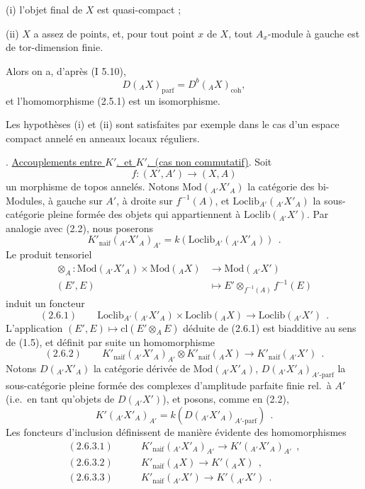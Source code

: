 \smallskip

(i) l'objet final de $X$ est quasi-compact ;

(ii) $X$ a assez de points, et, pour tout point $x$ de $X$, tout $A_x$-module \`{a} gauche est de tor-dimension finie.

Alors on a, d'apr\`{e}s (I 5.10),
\[
D({}_A X)_{\mathrm{parf}} = D^b({}_A X)_{\mathrm{coh}},
\]
et l'homomorphisme (2.5.1) est un isomorphisme.

Les hypoth\`{e}ses (i) et (ii) sont satisfaites par exemple dans le cas d'un espace compact annel\'{e} en anneaux locaux r\'{e}guliers.

\medskip

. \underline{Accouplements entre $K'$.\ et $K'$.\ (cas non commutatif)}. Soit
\[
f : (X', A') \longrightarrow (X, A)
\]
un morphisme de topos annel\'{e}s. Notons $\mathrm{Mod}({}_{A'} X'_A)$ la cat\'{e}gorie des bi-Modules, \`{a} gauche sur $A'$, \`{a} droite sur $f^{-1}(A)$, et $\mathrm{Loclib}_{A'}({}_{A'} X'_A)$ la sous-cat\'{e}gorie pleine form\'{e}e des objets qui appartiennent \`{a} $\mathrm{Loclib}({}_{A'} X')$. Par analogie avec (2.2), nous poserons
\[
K'_{\mathrm{naif}}({}_{A'} X'_A)_{A'} = k(\mathrm{Loclib}_{A'}({}_{A'} X'_A))\ \ .
\]
Le produit tensoriel
\begin{align*}
\otimes_A : \mathrm{Mod}({}_{A'} X'_A) \times \mathrm{Mod}({}_A X) & \longrightarrow \mathrm{Mod}({}_{A'} X') \\
(E', E) & \longmapsto E' \otimes_{f^{-1}(A)} f^{-1}(E)
\end{align*}
induit un foncteur
\[
\mathrm{(2.6.1)} \qquad \mathrm{Loclib}_{A'}({}_{A'} X'_A) \times \mathrm{Loclib}({}_A X) \longrightarrow \mathrm{Loclib}({}_{A'} X')\ \ .
\]
L'application $(E', E) \longmapsto \mathrm{cl}(E' \otimes_A E)$ d\'{e}duite de (2.6.1) est biadditive au sens de (1.5), et d\'{e}finit par suite un homomorphisme
\[
\mathrm{(2.6.2)} \qquad K'_{\mathrm{naif}}({}_{A'} X'_A)_{A'} \otimes K'_{\mathrm{naif}}({}_A X) \longrightarrow K'_{\mathrm{naif}}({}_{A'} X')\ \ .
\]
Notons $D({}_{A'} X'_A)$ la cat\'{e}gorie d\'{e}riv\'{e}e de $\mathrm{Mod}({}_{A'} X'_A)$, $D({}_{A'} X'_A)_{A'\text{-}\mathrm{parf}}$ la sous-cat\'{e}gorie pleine form\'{e}e des complexes d'amplitude parfaite finie rel.\ \`{a} $A'$ (i.e.\ en tant qu'objets de $D({}_{A'} X')$), et posons, comme en (2.2),
\[
K'({}_{A'} X'_A)_{A'} = k(D({}_{A'} X'_A)_{A'\text{-}\mathrm{parf}})\ \ .
\]
Les foncteurs d'inclusion d\'{e}finissent de mani\`{e}re \'{e}vidente des homomorphismes
\begin{align*}
\mathrm{(2.6.3.1)} \qquad & K'_{\mathrm{naif}}({}_{A'} X'_A)_{A'} \longrightarrow K'({}_{A'} X'_A)_{A'}\ \ , \\
\mathrm{(2.6.3.2)} \qquad & K'_{\mathrm{naif}}({}_A X) \longrightarrow K'({}_A X)\ \ , \\
\mathrm{(2.6.3.3)} \qquad & K'_{\mathrm{naif}}({}_{A'} X') \longrightarrow K'({}_{A'} X')\ \ .
\end{align*}
